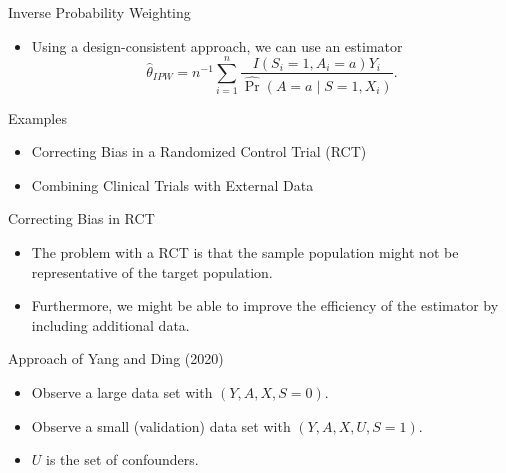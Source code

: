\documentclass[handout]{beamer} %
\begin{document}
\begin{frame}{Inverse Probability Weighting}

\begin{itemize}
    \item Using a design-consistent approach, we can use an estimator
      \[\hat \theta_{IPW} = n^{-1} \sum_{i = 1}^n 
      \frac{I(S_i = 1, A_i = a)Y_i}{\hat \Pr(A = a \mid S = 1, X_i)}.\]
\end{itemize}

\end{frame}

\begin{frame}{Examples}

\begin{itemize}
    \item Correcting Bias in a Randomized Control Trial (RCT)
    \item Combining Clinical Trials with External Data
\end{itemize}

\end{frame}

\begin{frame}{Correcting Bias in RCT}

\begin{itemize}
    \item The problem with a RCT is that the sample population might not be 
      representative of the target population.
    \item Furthermore, we might be able to improve the efficiency of the 
      estimator by including additional data.
\end{itemize}

\end{frame}

\begin{frame}{Approach of Yang and Ding (2020)}

\begin{itemize}
    \item Observe a large data set with $(Y, A, X, S = 0)$.
    \item Observe a small (validation) data set with $(Y, A, X, U, S = 1)$.
    \item $U$ is the set of confounders.
\end{itemize}

\end{frame}
\end{document}
